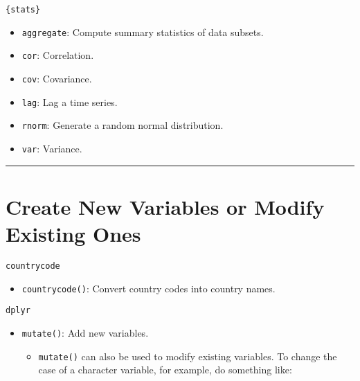 \documentclass[]{book}
\newenvironment{Shaded}{\begin{snugshade}}{\end{snugshade}}
\newcommand{\DataTypeTok}[1]{\textcolor[rgb]{0.13,0.29,0.53}{#1}}
\newcommand{\KeywordTok}[1]{\textcolor[rgb]{0.13,0.29,0.53}{\textbf{#1}}}
\newcommand{\NormalTok}[1]{#1}
\newcommand{\OperatorTok}[1]{\textcolor[rgb]{0.81,0.36,0.00}{\textbf{#1}}}
\newcommand{\StringTok}[1]{\textcolor[rgb]{0.31,0.60,0.02}{#1}}
\providecommand{\tightlist}{%
  \setlength{\itemsep}{0pt}\setlength{\parskip}{0pt}}
\begin{document}
\texttt{\{stats\}}

\begin{itemize}
\tightlist
\item
  \texttt{aggregate}: Compute summary statistics of data subsets.
\item
  \texttt{cor}: Correlation.
\item
  \texttt{cov}: Covariance.
\item
  \texttt{lag}: Lag a time series.
\item
  \texttt{rnorm}: Generate a random normal distribution.
\item
  \texttt{var}: Variance.
\end{itemize}

\begin{center}\rule{0.5\linewidth}{\linethickness}\end{center}

\hypertarget{create-new-variables-or-modify-existing-ones}{%
\section{Create New Variables or Modify Existing Ones}\label{create-new-variables-or-modify-existing-ones}}

\texttt{countrycode}

\begin{itemize}
\tightlist
\item
  \texttt{countrycode()}: Convert country codes into country names.
\end{itemize}

\texttt{dplyr}

\begin{itemize}
\tightlist
\item
  \texttt{mutate()}: Add new variables.

  \begin{itemize}
  \tightlist
  \item
    \texttt{mutate()} can also be used to modify existing variables. To change the case of a character variable, for example, do something like:
  \end{itemize}
\end{itemize}

\begin{Shaded}
\end{Shaded}
\end{document}
